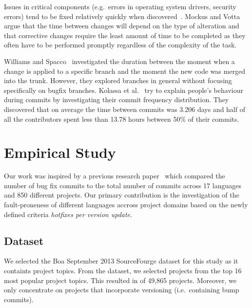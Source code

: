 \documentclass{sig-alternate}
\begin{document}
Issues in critical components (e.g.~errors in operating system drivers, security errors) tend to be fixed relatively quickly when discovered~\cite{Livshits2005}. Mockus and Votta~\cite{Mockus2000} argue that the time between changes will depend on the type of alteration and that corrective changes require the least amount of time to be completed as they often have to be performed promptly regardless of the complexity of the task.

Williams and Spacco~\cite{Williams2008} investigated the duration between the moment when a change is applied to a specific branch and the moment the new code was merged into the trunk. However, they explored branches in general without focusing specifically on bugfix branches. Kolassa et al.~\cite{Kolassa2013} try to explain people's behaviour during commits by investigating their commit frequency distribution. They discovered that on average the time between commits was 3.206 days and half of all the contributors spent less than 13.78 hours between 50\% of their commits.



\section{Empirical Study}


Our work was inspired by a previous research paper~\cite{Ray2014} which compared the number of bug fix commits to the total number of commits across 17 languages and 850 different projects. Our primary contribution is the investigation of the fault-proneness of different languages accross project domains based on the newly defined criteria \emph{hotfixes per version update}. 

\subsection{Dataset}
We selected the Boa September 2013 SourceFourge dataset for this study as it containts project topics. From the dataset, we selected projects from the top 16 most popular project topics. This resulted in of 49,865 projects. Moreover, we only concentrate on projects that incorporate versioning (i.e.\ containing bump commits).
\end{document}

